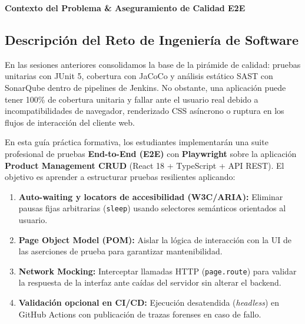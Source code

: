 \documentclass[10pt,letterpaper]{article}
\newcommand{\sectionBadge}[1]{%
  \refstepcounter{section}%
  \vspace{0.16cm}%
  \noindent%
  \colorbox{icesiBlue}{\color{white}\rule[-0.08cm]{0pt}{0.42cm}\hspace{0.16cm}\textbf{\normalsize \thesection}\hspace{0.16cm}}%
  \hspace{0.18cm}%
  {\fontsize{9.5}{12}\selectfont\textbf{\color{icesiDark}#1}}\\[-0.10cm]%
  \noindent{\color{icesiDark}\rule{\textwidth}{0.8pt}}\vspace{0.06cm}%
}
\begin{document}
\vspace{0.10cm}

\sectionBadge{Contexto del Problema \& Aseguramiento de Calidad E2E}

\subsection{Descripción del Reto de Ingeniería de Software}
En las sesiones anteriores consolidamos la base de la pirámide de calidad: pruebas unitarias con JUnit 5, cobertura con JaCoCo y análisis estático SAST con SonarQube dentro de pipelines de Jenkins. No obstante, una aplicación puede tener 100\% de cobertura unitaria y fallar ante el usuario real debido a incompatibilidades de navegador, renderizado CSS asíncrono o ruptura en los flujos de interacción del cliente web.

En esta guía práctica formativa, los estudiantes implementarán una suite profesional de pruebas \textbf{End-to-End (E2E)} con \textbf{Playwright} sobre la aplicación \textbf{Product Management CRUD} (React 18 + TypeScript + API REST). El objetivo es aprender a estructurar pruebas resilientes aplicando:
\begin{enumerate}[itemsep=1pt]
  \item \textbf{Auto-waiting y locators de accesibilidad (W3C/ARIA):} Eliminar pausas fijas arbitrarias (\texttt{sleep}) usando selectores semánticos orientados al usuario.
  \item \textbf{Page Object Model (POM):} Aislar la lógica de interacción con la UI de las aserciones de prueba para garantizar mantenibilidad.
  \item \textbf{Network Mocking:} Interceptar llamadas HTTP (\texttt{page.route}) para validar la respuesta de la interfaz ante caídas del servidor sin alterar el backend.
  \item \textbf{Validación opcional en CI/CD:} Ejecución desatendida (\textit{headless}) en GitHub Actions con publicación de trazas forenses en caso de fallo.
\end{enumerate}
\end{document}
